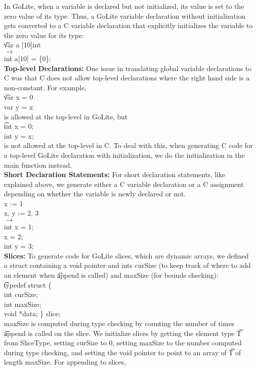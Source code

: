 \documentclass[11pt]{article}
\begin{document}
In GoLite, when a variable is declared but not initialized, its value is set to the zero value of its type. Thus, a GoLite variable declaration without initialization gets converted to a C variable declaration that explicitly initializes the variable to the zero value for its type:
\\[6pt]
\t{var a [10]int \\
$\longrightarrow$\\
int a[10] = \{0\};}
\\[12pt]
{\bf Top-level Declarations: }One issue in translating global variable declarations to C was that C does not allow top-level declarations where the right hand side is a non-constant. For example, 
\\[6pt]
\t{var x = 0\\
var y = x}
\\[6pt]
is allowed at the top-level in GoLite, but
\\[6pt]
\t{int x = 0;\\
int y = x;}
\\[6pt]
is not allowed at the top-level in C. To deal with this, when generating C code for a top-level GoLite declaration with initialization, we do the initialization in the main function instead.
\\[12pt]
{\bf Short Declaration Statements: }For short declaration statements, like explained above, we generate either a C variable declaration or a C assignment depending on whether the variable is newly declared or not.
\\[6pt]
\t{
x := 1\\
x, y := 2, 3 \\
$\longrightarrow$ \\
int x = 1; \\
x = 2; \\
int y = 3;
}
\\[12pt]
{\bf Slices: } To generate code for GoLite slices, which are dynamic arrays, we defined a struct containing a void pointer and ints curSize (to keep track of where to add an element when \t{append} is called) and maxSize (for bounds checking):
\\[6pt]
\t{typedef struct \{ \\
\indent int curSize; \\
\indent int maxSize; \\
\indent void *data; \} slice;}
\\[6pt]
maxSize is computed during type checking by counting the number of times \t{append} is called on the slice. We initialize slices by getting the element type \t{T} from SliceType, setting curSize to 0, setting maxSize to the number computed during type checking, and setting the void pointer to point to an array of \t{T} of length maxSize. For appending to slices,
\end{document}
